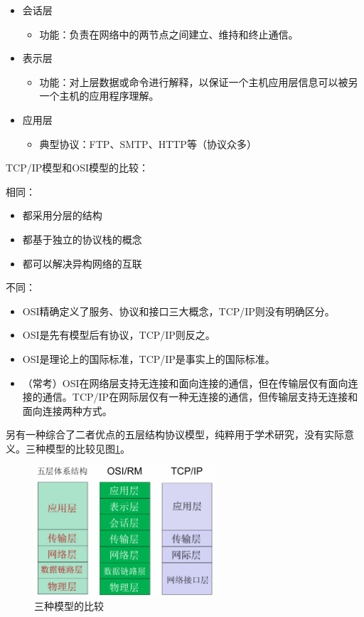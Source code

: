 \documentclass[12pt, a4paper, oneside]{ctexart}
\begin{document}
\begin{itemize}
\begin{itemize}
    \end{itemize}
    \item 会话层
    \begin{itemize}
        \item 功能：负责在网络中的两节点之间建立、维持和终止通信。
    \end{itemize}
    \item 表示层
    \begin{itemize}
        \item 功能：对上层数据或命令进行解释，以保证一个主机应用层信息可以被另一个主机的应用程序理解。
    \end{itemize}
    \item 应用层
    \begin{itemize}
        \item 典型协议：FTP、SMTP、HTTP等（协议众多）
    \end{itemize}
\end{itemize}

TCP/IP模型和OSI模型的比较：

相同：
\begin{itemize}
    \item 都采用分层的结构
    \item 都基于独立的协议栈的概念
    \item 都可以解决异构网络的互联
\end{itemize}

不同：
\begin{itemize}
    \item OSI精确定义了服务、协议和接口三大概念，TCP/IP则没有明确区分。
    \item OSI是先有模型后有协议，TCP/IP则反之。
    \item OSI是理论上的国际标准，TCP/IP是事实上的国际标准。
    \item （常考）OSI在网络层支持无连接和面向连接的通信，但在传输层仅有面向连接的通信。TCP/IP在网际层仅有一种无连接的通信，但传输层支持无连接和面向连接两种方式。
\end{itemize}

另有一种综合了二者优点的五层结构协议模型，纯粹用于学术研究，没有实际意义。三种模型的比较见图\ref{compare_of_three_architectures}。

\begin{figure}
    \centering
    \includegraphics[width=0.6\textwidth]{./images/compare_of_three_architectures.png}
    \caption{三种模型的比较}
    \label{compare_of_three_architectures}
\end{figure}
\end{document}
